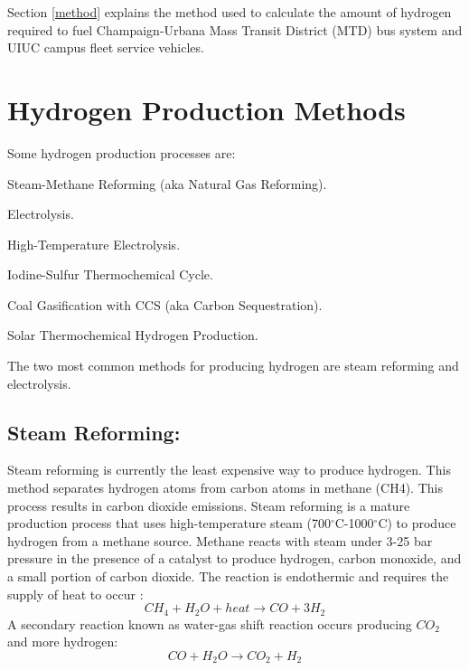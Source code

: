 \documentclass{anstrans}
\begin{document}
Section \ref{method} explains the method used to calculate the amount of hydrogen required to fuel Champaign-Urbana Mass Transit District (MTD) bus system and UIUC campus fleet service vehicles.

\section{Hydrogen Production Methods}
\label{section:hydroprod}

Some hydrogen production processes are: 
\begin{description}[font=$\bullet$\scshape\bfseries]
	\item[] Steam-Methane Reforming (aka Natural Gas Reforming).
	\item[] Electrolysis.
	\item[] High-Temperature Electrolysis.
	\item[] Iodine-Sulfur Thermochemical Cycle.
	\item[] Coal Gasification with CCS (aka Carbon Sequestration).
	\item[] Solar Thermochemical Hydrogen Production.
\end{description}

The two most common methods for producing hydrogen are steam reforming and electrolysis.

\subsection{Steam Reforming:}

Steam reforming is currently the least expensive way to produce hydrogen. This method separates hydrogen atoms from carbon atoms in methane (CH4). This process results in carbon dioxide emissions.
Steam reforming is a mature production process that uses high-temperature steam (700$^{\circ}$C-1000$^{\circ}$C) to produce hydrogen from a methane source. Methane reacts with steam under 3-25 bar pressure in the presence of a catalyst to produce hydrogen, carbon monoxide, and a small portion of carbon dioxide. The reaction is endothermic and requires the supply of heat to occur \cite{noauthor_hydrogen_nodate}:
\begin{equation}
CH_4 + H_2O + heat \rightarrow CO + 3H_2
\end{equation}
A secondary reaction known as water-gas shift reaction occurs producing $CO_2$ and more hydrogen:
\begin{equation}
CO + H_2O \rightarrow CO_2 + H_2
\end{equation}
\end{document}
